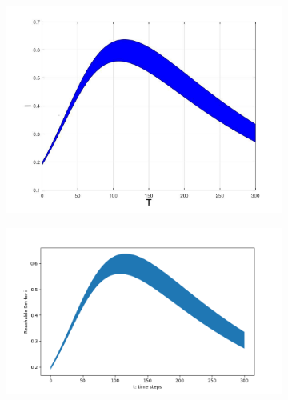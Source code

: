 \documentclass[EPiC]{easychair}
\begin{document}
\begin{figure}[h]
    \hspace{-15ex}   
    \begin{subfigure}{0.6\textwidth}
    \centering
    \includegraphics[width=\textwidth]{SapoFigures/SIR/SapoSIR_I.jpg}
    \end{subfigure}
    \begin{subfigure}{0.6\textwidth}
    \centering
    \includegraphics[width=1.2\textwidth]{SapoFigures/SIR/KaaSIR_I.png}
    \end{subfigure}
  

\end{figure}
\end{document}
